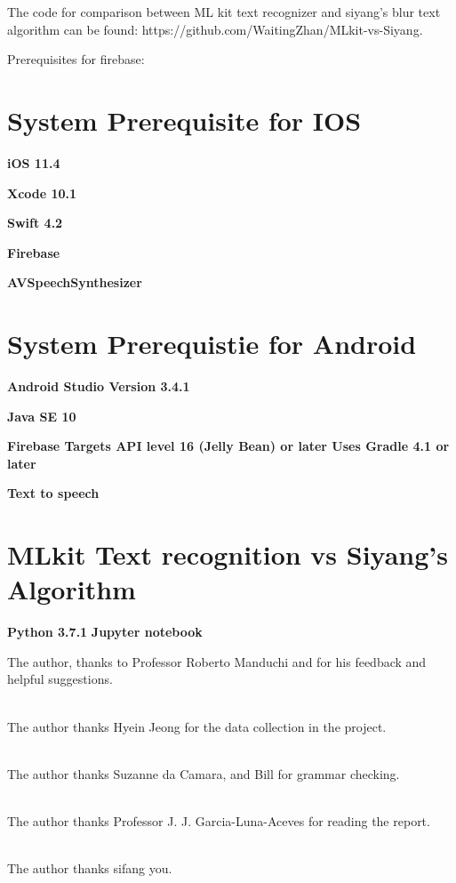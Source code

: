 \documentclass[11pt]{ucscthesis}
\begin{document}
The code for comparison between ML kit text recognizer and siyang's blur text algorithm can be found: https://github.com/WaitingZhan/MLkit-vs-Siyang.


Prerequisites for firebase:
\section{System Prerequisite for IOS}
\textbf{iOS 11.4}


\textbf{Xcode 10.1}


\textbf{Swift 4.2}


\textbf{Firebase}

\textbf{AVSpeechSynthesizer}


\section{System Prerequistie for Android}
\textbf{Android Studio Version 3.4.1} 


\textbf{Java SE 10}


\textbf{Firebase Targets API level 16 (Jelly Bean) or later
Uses Gradle 4.1 or later}

\textbf{Text to speech}

\section{MLkit Text recognition vs Siyang's Algorithm}
\textbf{Python 3.7.1}
\textbf{Jupyter notebook}




\def\baselinestretch{1.0}\large\normalsize



\begin{acknowledgements}
The author, thanks to Professor Roberto Manduchi and for his feedback and helpful suggestions.

\\
The author thanks Hyein Jeong for the data collection in the project.

\\ The author thanks Suzanne da Camara, and Bill for grammar checking.

\\ The author thanks Professor J. J. Garcia-Luna-Aceves for reading the report.

\\The author thanks sifang you.

\end{acknowledgements}
\end{document}
